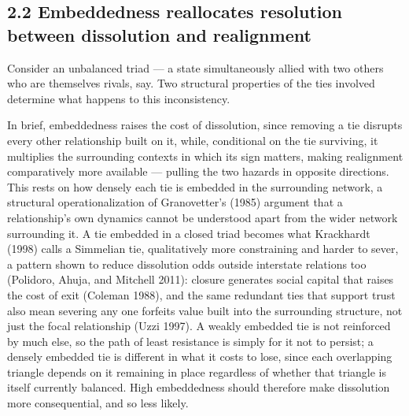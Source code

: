 \documentclass[Afour,sageh,times,doublespace]{sagej}
\begin{document}
\subsection*{2.2 Embeddedness reallocates resolution between dissolution and realignment}

Consider an unbalanced triad --- a state simultaneously allied with two others who are themselves rivals, say. Two structural properties of the ties involved determine what happens to this inconsistency.

In brief, embeddedness raises the cost of dissolution, since removing a tie disrupts every other relationship built on it, while, conditional on the tie surviving, it multiplies the surrounding contexts in which its sign matters, making realignment comparatively more available --- pulling the two hazards in opposite directions. This rests on how densely each tie is embedded in the surrounding network, a structural operationalization of Granovetter's (1985) argument that a relationship's own dynamics cannot be understood apart from the wider network surrounding it. A tie embedded in a closed triad becomes what Krackhardt (1998) calls a Simmelian tie, qualitatively more constraining and harder to sever, a pattern shown to reduce dissolution odds outside interstate relations too (Polidoro, Ahuja, and Mitchell 2011): closure generates social capital that raises the cost of exit (Coleman 1988), and the same redundant ties that support trust also mean severing any one forfeits value built into the surrounding structure, not just the focal relationship (Uzzi 1997). A weakly embedded tie is not reinforced by much else, so the path of least resistance is simply for it not to persist; a densely embedded tie is different in what it costs to lose, since each overlapping triangle depends on it remaining in place regardless of whether that triangle is itself currently balanced. High embeddedness should therefore make dissolution more consequential, and so less likely.
\end{document}
